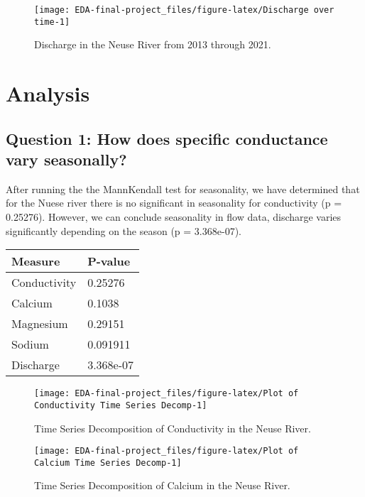 \documentclass[
  12pt,
]{article}
\begin{document}
\begin{figure}

\texttt{[image: EDA-final-project\_files/figure-latex/Discharge over time-1]} \hfill{}

\caption{Discharge in the Neuse River from 2013 through 2021.}\label{fig:Discharge over time}
\end{figure}

\newpage

\hypertarget{analysis}{%
\section{Analysis}\label{analysis}}

\hypertarget{question-1-how-does-specific-conductance-vary-seasonally}{%
\subsection{Question 1: How does specific conductance vary
seasonally?}\label{question-1-how-does-specific-conductance-vary-seasonally}}

After running the the MannKendall test for seasonality, we have
determined that for the Nuese river there is no significant in
seasonality for conductivity (p = 0.25276). However, we can conclude
seasonality in flow data, discharge varies significantly depending on
the season (p = 3.368e-07).

\begin{longtable}[]{@{}ll@{}}
\toprule
Measure & P-value \\
\midrule
\endhead
Conductivity & 0.25276 \\
Calcium & 0.1038 \\
Magnesium & 0.29151 \\
Sodium & 0.091911 \\
Discharge & 3.368e-07 \\
\bottomrule
\end{longtable}

\begin{figure}

\texttt{[image: EDA-final-project\_files/figure-latex/Plot of Conductivity Time Series Decomp-1]} \hfill{}

\caption{Time Series Decomposition of Conductivity in the Neuse River.}\label{fig:Plot of Conductivity Time Series Decomp}
\end{figure}

\begin{figure}

\texttt{[image: EDA-final-project\_files/figure-latex/Plot of Calcium Time Series Decomp-1]} \hfill{}

\caption{Time Series Decomposition of Calcium in the Neuse River.}\label{fig:Plot of Calcium Time Series Decomp}
\end{figure}
\end{document}
